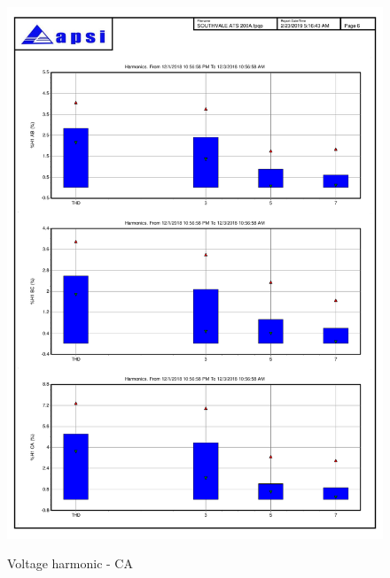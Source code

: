 \begin{figure}
	\includegraphics[width=\textwidth]{figures/fig_ch04_elecaudit_harmonicstudy03} \\
	\caption{Voltage harmonic - CA}
	\label{fig_ch04_elecaudit_harmonicstudy03} 
\end{figure}

